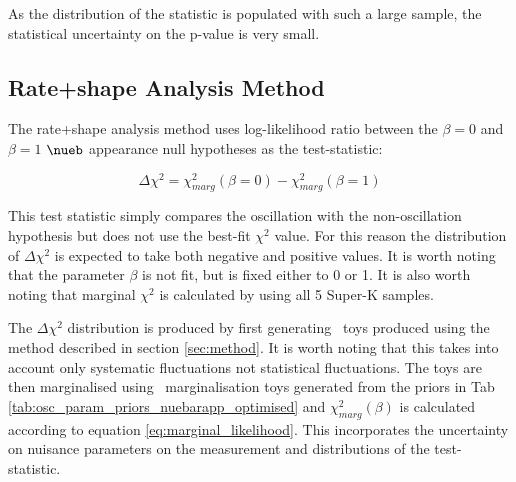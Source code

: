 As the distribution of the statistic is populated with such a large sample, the statistical uncertainty on the p-value is very small.






\subsection{Rate+shape Analysis Method}
\label{sec:method_rate+shape}
The rate+shape analysis method uses log-likelihood ratio between the $\beta = 0$ and $\beta = 1$ $\nueb$ appearance null hypotheses as the test-statistic:

\begin{equation} \label{eq:Delta_chisq}
\Delta \chi^2 = \chi_{marg}^2 \left( \beta = 0 \right) - \chi_{marg}^2 \left( \beta = 1 \right)
\end{equation}

This test statistic simply compares the oscillation with the non-oscillation hypothesis but does not use the best-fit $\chi^2$ value. For this reason the distribution of $\Delta \chi^2$ is expected to take both negative and positive values. It is worth noting that the parameter $\beta$ is not fit, but is fixed either to 0 or 1. It is also worth noting that marginal $\chi^2$ is calculated by using all 5 Super-K samples.

The $\Delta \chi^2$ distribution is produced by first generating \NToysFakeDataRatePlusShape\ toys produced using the method described in section \ref{sec:method}. It is worth noting that this takes into account only systematic fluctuations not statistical fluctuations. The toys are then marginalised using \NToysMarg\ marginalisation toys generated from the priors in Tab \ref{tab:osc_param_priors_nuebarapp_optimised} and $\chi^2_{marg} \left( \beta \right)$ is calculated according to equation \ref{eq:marginal_likelihood}. This incorporates the uncertainty on nuisance parameters on the measurement and distributions of the test-statistic.

